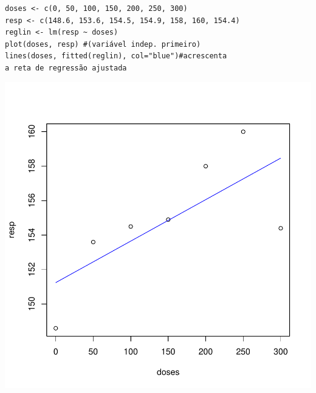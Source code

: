 \documentclass[14pt,aspectratio=1610]{beamer}
\begin{document}
\begin{frame}[fragile]{}
\frametitle{ }
\begin{block}{}
\begin{center}
\begin{verbatim}
doses <- c(0, 50, 100, 150, 200, 250, 300)
resp <- c(148.6, 153.6, 154.5, 154.9, 158, 160, 154.4)
reglin <- lm(resp ~ doses) 
plot(doses, resp) #(variável indep. primeiro)
lines(doses, fitted(reglin), col="blue")#acrescenta 
a reta de regressão ajustada
\end{verbatim}
\end{center}
\end{block}
\vspace{-1.3cm}
\begin{center}
\includegraphics{Aula4Regressao/Figuras/Aula4-004.pdf}
\end{center}
\end{frame}
\end{document}
